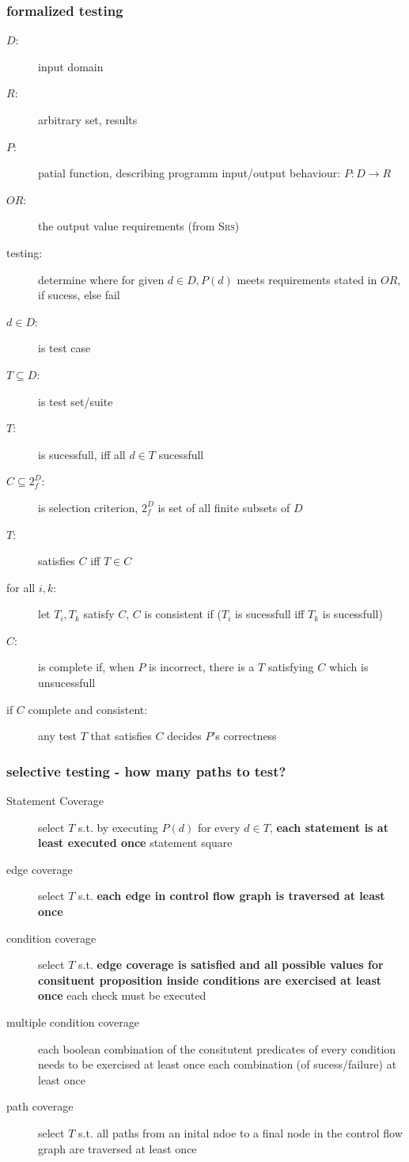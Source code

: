 \documentclass[a4paper, 10pt]{article}
\begin{document}
\subsubsection*{formalized testing}
\begin{description}
	\item[$D$:] input domain
	\item[$R$:] arbitrary set, results
	\item[$P$:] patial function, describing programm input/output behaviour: $P:D\to R$
	\item[$OR$:] the output value requirements (from \textsc{Srs})
	\item[testing:]determine where for given $d\in D,P(d)$ meets requirements stated in $OR$, if \follows sucess, else fail
	\item[$d\in D$:] is test case
	\item[$T\subseteq D$:] is test set/suite
	\item[$T$:] is sucessfull, iff all $d\in T$ sucessfull
	\item[$C\subseteq 2^D_f$:]  is selection criterion, $2^D_f$ is set of all finite subsets of $D$
	\item[$T$:] satisfies $C$ iff $T\in C$
	\item[for all $i,k$:] let $T_i,T_k$ satisfy $C$, $C$ is consistent if ($T_i$ is sucessfull iff $T_k$ is sucessfull)
	\item[$C$:] is complete if, when $P$ is incorrect, there is a $T$ satisfying $C$ which is unsucessfull
	\item[if $C$ complete and consistent:] any test $T$ that satisfies $C$ decides $P$'s correctness
\end{description}

\subsubsection*{selective testing - how many paths to test?}
\begin{description}
	\item[Statement Coverage] select $T$ s.t. by executing $P(d)$ for every $d\in T$, \textbf{each statement is at least executed once} {\tiny statement \follows square}
	\item[edge coverage] select $T$ s.t. \textbf{each edge in control flow graph is traversed at least once}
	\item[condition coverage] select $T$ s.t. \textbf{edge coverage is satisfied and all possible values for consituent proposition inside conditions are exercised at least once} {\tiny each check must be executed}
	\item[multiple condition coverage] each boolean combination of the consitutent predicates of every condition needs to be exercised at least once {\tiny each combination (of sucess/failure) at least once}
	\item[path coverage] select $T$ s.t. all paths from an inital ndoe to a final node in the control flow graph are traversed at least once
\end{description}
\end{document}
